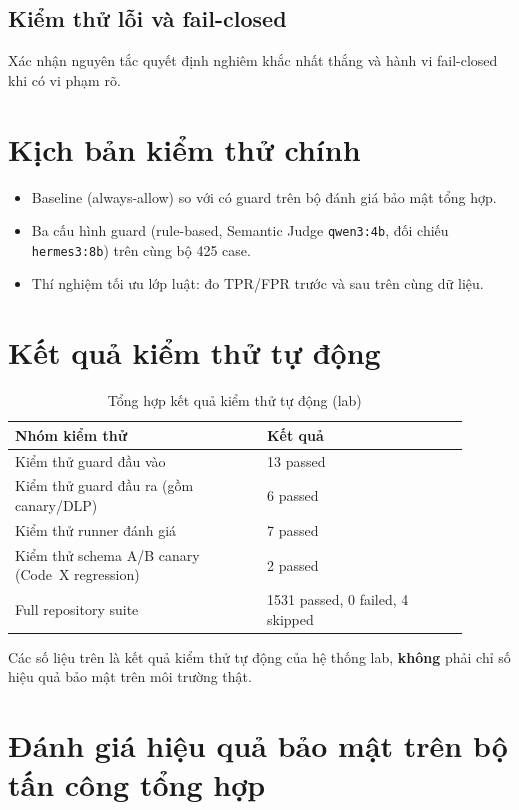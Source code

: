 \subsection{Kiểm thử lỗi và fail-closed}
Xác nhận nguyên tắc quyết định nghiêm khắc nhất thắng và hành vi fail-closed khi có vi phạm rõ.

\section{Kịch bản kiểm thử chính}

\begin{itemize}
    \item Baseline (always-allow) so với có guard trên bộ đánh giá bảo mật tổng hợp.
    \item Ba cấu hình guard (rule-based, Semantic Judge \texttt{qwen3:4b}, đối chiếu \texttt{hermes3:8b}) trên cùng bộ 425 case.
    \item Thí nghiệm tối ưu lớp luật: đo TPR/FPR trước và sau trên cùng dữ liệu.
\end{itemize}

\section{Kết quả kiểm thử tự động}

\begin{table}[H]
\centering
\caption{Tổng hợp kết quả kiểm thử tự động (lab)}
\label{tab:test-summary}
\begin{tabular}{@{}p{0.5\linewidth}p{0.4\linewidth}@{}}
\toprule
\textbf{Nhóm kiểm thử} & \textbf{Kết quả} \\
\midrule
Kiểm thử guard đầu vào & 13 passed \\
Kiểm thử guard đầu ra (gồm canary/DLP) & 6 passed \\
Kiểm thử runner đánh giá & 7 passed \\
Kiểm thử schema A/B canary (Code~X regression) & 2 passed \\
Full repository suite & 1531 passed, 0 failed, 4 skipped \\
\bottomrule
\end{tabular}
\end{table}

Các số liệu trên là kết quả kiểm thử tự động của hệ thống lab, \textbf{không} phải chỉ số hiệu quả bảo mật trên môi trường thật.

\section{Đánh giá hiệu quả bảo mật trên bộ tấn công tổng hợp}
\label{sec:sec-eval}

